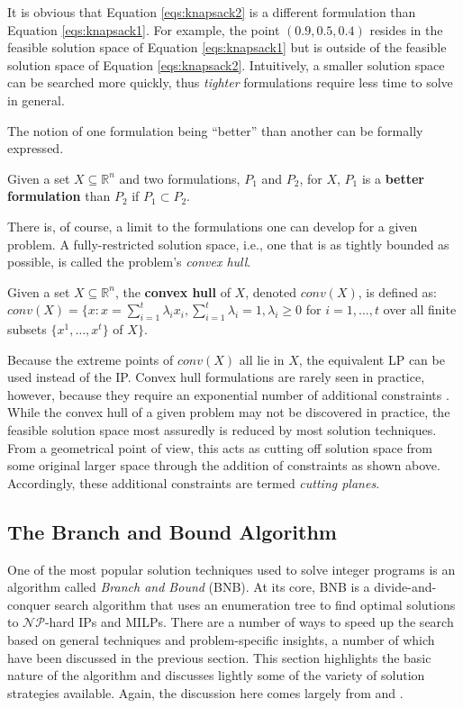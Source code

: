 It is obvious that Equation \ref{eqs:knapsack2} is a different formulation than
Equation \ref{eqs:knapsack1}. For example, the point $(0.9, 0.5, 0.4)$ resides
in the feasible solution space of Equation \ref{eqs:knapsack1} but is outside of
the feasible solution space of Equation \ref{eqs:knapsack2}. Intuitively, a
smaller solution space can be searched more quickly, thus \textit{tighter}
formulations require less time to solve in general.

The notion of one formulation being ``better'' than another can be formally
expressed.

\begin{define}
Given a set $X \subseteq \mathbb{R}^n$ and two formulations, $P_1$ and $P_2$,
for $X$, $P_1$ is a \textbf{better formulation} than $P_2$ if $P_1 \subset P_2$.
\end{define}

There is, of course, a limit to the formulations one can develop for a given
problem. A fully-restricted solution space, i.e., one that is as tightly bounded
as possible, is called the problem's \textit{convex hull}. 

\begin{define}
Given a set $X \subseteq \mathbb{R}^n$, the \textbf{convex hull} of $X$, denoted
$conv(X)$, is defined as: $conv(X) = \{x : x = \sum_{i=1}^{t} \lambda_i
x_i, \sum_{i=1}^{t} \lambda_i = 1, \lambda_i \geq 0$ for $i = 1, \ldots, t$ over
all finite subsets $\{x^1, \ldots, x^t \}$ of $X\}$.
\end{define}

Because the extreme points of $conv(X)$ all lie in $X$, the equivalent LP can be
used instead of the IP. Convex hull formulations are rarely seen in practice,
however, because they require an exponential number of additional
constraints \cite{wolsey_integer_1998}. While the convex hull of a given problem
may not be discovered in practice, the feasible solution space most assuredly is
reduced by most solution techniques. From a geometrical point of view, this acts
as cutting off solution space from some original larger space through the
addition of constraints as shown above. Accordingly, these additional
constraints are termed \textit{cutting planes}.

\subsection{The Branch and Bound Algorithm}\label{sec:bnb}

One of the most popular solution techniques used to solve integer programs is an
algorithm called \textit{Branch and Bound} (BNB). At its core, BNB is a
divide-and-conquer search algorithm that uses an enumeration tree to find
optimal solutions to $\mathcal{NP}$-hard IPs and MILPs. There are a number of
ways to speed up the search based on general techniques and problem-specific
insights, a number of which have been discussed in the previous section. This
section highlights the basic nature of the algorithm and discusses lightly some
of the variety of solution strategies available. Again, the discussion here
comes largely from \cite{wolsey_integer_1998} and \cite{luedtke_class_2010}.

